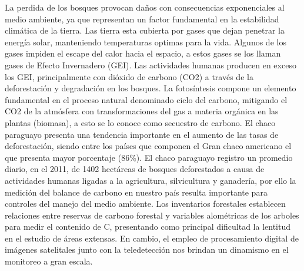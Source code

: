 La perdida de los bosques provocan da\~{n}os con consecuencias exponenciales al medio ambiente, ya que representan un factor fundamental en la estabilidad clim\'atica de la tierra. Las tierra esta cubierta por gases que dejan penetrar la energ\'ia solar, manteniendo temperaturas optimas para la vida. Algunos de los gases impiden el escape del calor hacia el espacio, a estos gases se los llaman gases de Efecto Invernadero (GEI). Las actividades humanas producen en exceso los GEI, principalmente con di\'oxido de carbono (CO2) a trav\'es de la deforestaci\'on y degradaci\'on en los bosques. La fotos\'intesis compone un elemento fundamental en el proceso natural denominado ciclo del carbono, mitigando el CO2 de la atm\'osfera con transformaciones del gas a materia org\'anica en las plantas (biomasa), a esto se lo conoce como secuestro de carbono. El chaco paraguayo presenta una tendencia importante en el aumento de las tasas de deforestaci\'on, siendo entre los pa\'ises que componen el Gran chaco americano el que presenta mayor porcentaje (86\%). El chaco paraguayo registro un promedio diario, en el 2011, de 1402 hect\'areas de bosques deforestados a causa de actividades humanas ligadas a la agricultura, silvicultura y ganadería, por ello la medici\'on del balance de carbono en nuestro pa\'is resulta importante para controles del manejo del medio ambiente. Los inventarios forestales establecen relaciones entre reservas de carbono forestal y variables alom\'etricas de los arboles  para medir el contenido de C, presentando como principal dificultad la lentitud en el estudio de \'areas extensas. En cambio, el empleo de procesamiento digital de im\'agenes satelitales junto con la teledetecci\'on nos brindan un dinamismo en el monitoreo a gran escala.